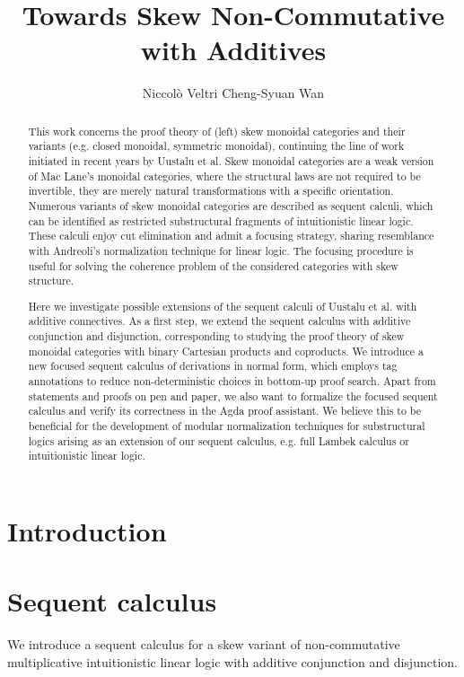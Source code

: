 \documentclass[submission,copyright,creativecommons]{eptcs}
\title{Towards Skew Non-Commutative \MILL \text{ }with Additives}
\author{
Niccol{\`o} Veltri \qquad\qquad Cheng-Syuan Wan
\institute{Tallinn University of Technology, Estonia}
\email{\quad niccolo@cs.ioc.ee \quad\qquad cswan@cs.ioc.ee}
}
\theoremstyle{definition}
\begin{document}
\maketitle
\begin{abstract}
This work concerns the proof theory of (left) skew monoidal categories and their variants (e.g. closed monoidal, symmetric monoidal), continuing the line of work initiated in recent years by Uustalu et al.
Skew monoidal categories are a weak version of Mac Lane's monoidal categories, where the structural laws are not required to be invertible, they are merely natural transformations with a specific orientation. 
Numerous variants of skew monoidal categories are described as sequent calculi, which can be identified as restricted substructural fragments of intuitionistic linear logic. These calculi enjoy cut elimination and admit a focusing strategy, sharing resemblance with Andreoli's normalization technique for linear logic. The focusing procedure is useful for solving the coherence problem of the considered categories with skew structure.

Here we investigate possible extensions of the sequent calculi of Uustalu et al. with additive connectives. 
As a first step, we extend the sequent calculus with additive conjunction and disjunction, corresponding to studying the proof theory of skew monoidal categories with binary Cartesian products and coproducts. 
We introduce a new focused sequent calculus of derivations in normal form, which employs tag annotations to reduce non-deterministic choices in bottom-up proof search.
Apart from statements and proofs on pen and paper, we also want to formalize the focused sequent calculus and verify its correctness in the Agda proof assistant.
We believe this to be beneficial for the development of modular normalization techniques for substructural logics arising as an extension of our sequent calculus, e.g. full Lambek calculus or intuitionistic linear logic.

\end{abstract}


\section{Introduction}
\section{Sequent calculus}
We introduce a sequent calculus for a skew variant of non-commutative multiplicative intuitionistic linear logic with additive conjunction and disjunction.
\end{document}
